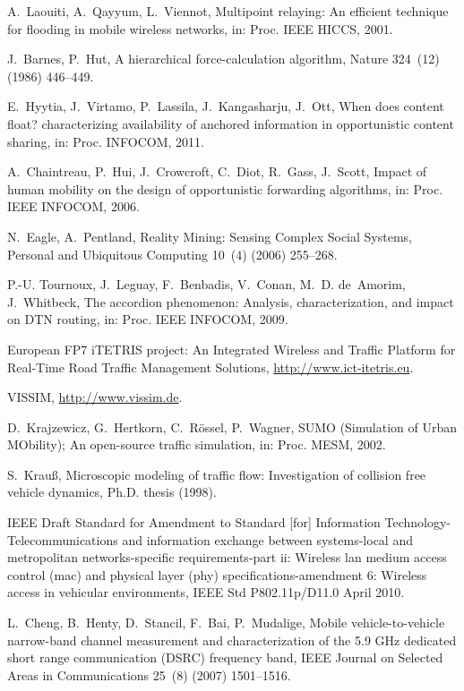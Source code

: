 \documentclass[preprint]{elsarticle}
\begin{document}
\begin{thebibliography}{10}
A.~Laouiti, A.~Qayyum, L.~Viennot, {Multipoint relaying: An efficient technique
  for flooding in mobile wireless networks}, in: Proc. {IEEE HICCS}, 2001.

J.~Barnes, P.~Hut, A hierarchical force-calculation algorithm, Nature 324~(12)
  (1986) 446--449.

E.~Hyytia, J.~Virtamo, P.~Lassila, J.~Kangasharju, J.~Ott, When does content
  float? characterizing availability of anchored information in opportunistic
  content sharing, in: Proc. {INFOCOM}, 2011.

A.~Chaintreau, P.~Hui, J.~Crowcroft, C.~Diot, R.~Gass, J.~Scott, Impact of
  human mobility on the design of opportunistic forwarding algorithms, in:
  Proc. {IEEE INFOCOM}, 2006.

N.~Eagle, A.~Pentland, {Reality Mining: Sensing Complex Social Systems},
  Personal and Ubiquitous Computing 10~(4) (2006) 255--268.

P.-U. Tournoux, J.~Leguay, F.~Benbadis, V.~Conan, M.~D. de~Amorim, J.~Whitbeck,
  The accordion phenomenon: Analysis, characterization, and impact on {DTN}
  routing, in: Proc. {IEEE INFOCOM}, 2009.

European {FP7 iTETRIS project: An Integrated Wireless and Traffic Platform for
  Real-Time Road Traffic Management Solutions},
  \href{http://www.ict-itetris.eu}{http://www.ict-itetris.eu}.

{VISSIM}, \href{http://www.vissim.de}{http://www.vissim.de}.

D.~Krajzewicz, G.~Hertkorn, C.~R\"ossel, P.~Wagner, {SUMO (Simulation of Urban
  MObility); An open-source traffic simulation}, in: Proc. {MESM}, 2002.

S.~Krau\ss, Microscopic modeling of traffic flow: Investigation of collision
  free vehicle dynamics, Ph.D. thesis (1998).

{IEEE Draft Standard for Amendment to Standard [for] Information
  Technology-Telecommunications} and information exchange between systems-local
  and metropolitan networks-specific requirements-part ii: Wireless lan medium
  access control (mac) and physical layer (phy) specifications-amendment 6:
  Wireless access in vehicular environments, IEEE Std P802.11p/D11.0 April
  2010.

L.~Cheng, B.~Henty, D.~Stancil, F.~Bai, P.~Mudalige, {Mobile vehicle-to-vehicle
  narrow-band channel measurement and characterization of the 5.9 GHz dedicated
  short range communication (DSRC) frequency band}, IEEE Journal on Selected
  Areas in Communications 25~(8) (2007) 1501--1516.


\end{thebibliography}
\end{document}
